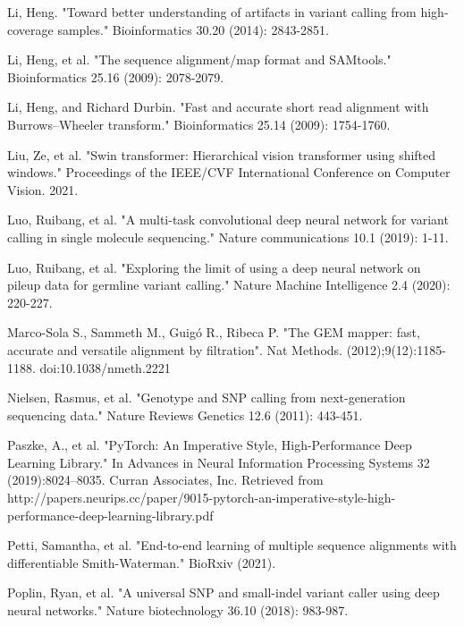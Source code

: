 \documentclass[]{article}
\begin{document}
\vspace{8pt}
Li, Heng. "Toward better understanding of artifacts in variant calling from high-coverage samples." Bioinformatics 30.20 (2014): 2843-2851.

\vspace{8pt}
Li, Heng, et al. "The sequence alignment/map format and SAMtools." Bioinformatics 25.16 (2009): 
2078-2079.


\vspace{8pt}
Li, Heng, and Richard Durbin. "Fast and accurate short read alignment with Burrows–Wheeler transform." Bioinformatics 25.14 (2009): 1754-1760.

\vspace{8pt}
Liu, Ze, et al. "Swin transformer: Hierarchical vision transformer using shifted windows." Proceedings of the IEEE/CVF International Conference on Computer Vision. 2021.

\vspace{8pt}
Luo, Ruibang, et al. "A multi-task convolutional deep neural network for variant calling in single molecule sequencing." Nature communications 10.1 (2019): 1-11.

\vspace{8pt}
Luo, Ruibang, et al. "Exploring the limit of using a deep neural network on pileup data for germline variant calling." Nature Machine Intelligence 2.4 (2020): 220-227.

\vspace{8pt}
Marco-Sola S., Sammeth M., Guigó R., Ribeca P. "The GEM mapper: fast, accurate and versatile alignment by filtration". Nat Methods. (2012);9(12):1185-1188. doi:10.1038/nmeth.2221

\vspace{8pt}
Nielsen, Rasmus, et al. "Genotype and SNP calling from next-generation sequencing data." Nature Reviews Genetics 12.6 (2011): 443-451.

\vspace{8pt}
Paszke, A., et al. "PyTorch: An Imperative Style, High-Performance Deep Learning Library." In Advances in Neural Information Processing Systems 32 (2019):8024–8035. Curran Associates, Inc. Retrieved from http://papers.neurips.cc/paper/9015-pytorch-an-imperative-style-high-performance-deep-learning-library.pdf

\vspace{8pt}
Petti, Samantha, et al. "End-to-end learning of multiple sequence alignments with differentiable Smith-Waterman." BioRxiv (2021).

\vspace{8pt}
Poplin, Ryan, et al. "A universal SNP and small-indel variant caller using deep neural networks." Nature biotechnology 36.10 (2018): 983-987.
\end{document}
